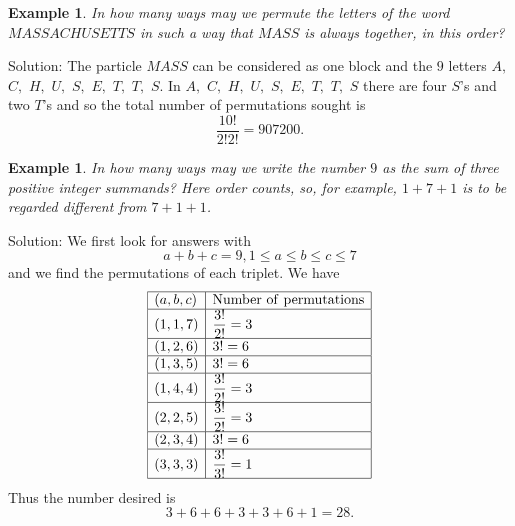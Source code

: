 \documentclass[11pt, openany]{book}
\theoremstyle{change} \theoremheaderfont{\blue\sffamily\bfseries}
\newtheorem{exa}[thm]{Example}
\theoremstyle{nonumberplain} \theoremheaderfont{\sffamily\bfseries}
\newcommand{\í}{\'{\i}}
\begin{document}
\begin{exa} In how many ways may we permute the letters of the word
$MASSACHUSETTS$ in such a way that $MASS$ is always together, in
this order?
\end{exa}
Solution: The particle $MASS$  can be considered as one block and
the $9$ letters $A,$ $C,$ $H,$ $U,$ $S,$ $E,$ $T,$ $T,$ $S$. In $A,$
$C,$ $H,$ $U,$ $S,$ $E,$ $T,$ $T,$ $S$ there are four $S$'s and two
$T$'s and so the total number of permutations sought is
$$\frac{10!}{2!2!} = 907200.
$$

\begin{exa}\label{exa:summingto9}
In how many ways may we write the number $9$ as the sum of three
positive integer summands? Here order counts, so, for example, $1 +
7 + 1$ is to be regarded different from $7 + 1 + 1$.
\end{exa}
Solution: We first look for answers with $$a + b + c = 9, 1 \leq a
\leq b \leq c \leq 7$$ and we find the permutations of each triplet.
We have
$$\begin{array}{|l|l|}\hline (a,b,c) & \mathrm{Number\ of\ permutations} \\
\hline (1,1,7) & \dfrac{3!}{2!} = 3 \\
\hline (1,2,6) & 3! = 6 \\
\hline (1,3,5) & 3! = 6  \\
\hline (1,4,4) & \dfrac{3!}{2!} = 3 \\
\hline (2,2,5) & \dfrac{3!}{2!} = 3 \\
\hline (2,3,4) & 3! = 6 \\
\hline (3,3,3) & \dfrac{3!}{3!} = 1 \\
\hline
   \end{array}$$
Thus the number desired is $$ 3 + 6 + 6 +3 + 3 + 6 + 1 =   28.$$
\end{document}
